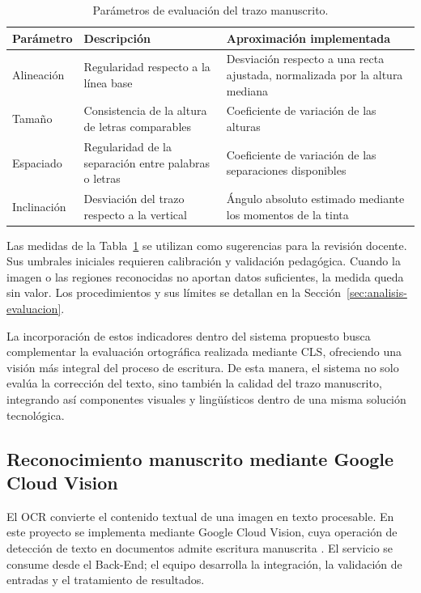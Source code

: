 \begin{table}[H]
\centering
\caption{Parámetros de evaluación del trazo manuscrito.}
\label{tab:parametros_evaluacion}
\renewcommand{\arraystretch}{1.5} %
\begin{tabular}{|>{\centering\arraybackslash}m{3cm}|>{\centering\arraybackslash}m{5.5cm}|>{\centering\arraybackslash}m{6cm}|}
\hline
\textbf{Parámetro} & \textbf{Descripción} & \textbf{Aproximación implementada} \\ \hline
Alineación & Regularidad respecto a la línea base & Desviación respecto a una recta ajustada, normalizada por la altura mediana \\ \hline
Tamaño & Consistencia de la altura de letras comparables & Coeficiente de variación de las alturas \\ \hline
Espaciado & Regularidad de la separación entre palabras o letras & Coeficiente de variación de las separaciones disponibles \\ \hline
Inclinación & Desviación del trazo respecto a la vertical & Ángulo absoluto estimado mediante los momentos de la tinta \\ \hline
\end{tabular}
\end{table}

Las medidas de la Tabla~\ref{tab:parametros_evaluacion} se utilizan como sugerencias para la revisión docente. Sus umbrales iniciales requieren calibración y validación pedagógica. Cuando la imagen o las regiones reconocidas no aportan datos suficientes, la medida queda sin valor. Los procedimientos y sus límites se detallan en la Sección~\ref{sec:analisis-evaluacion}.

La incorporación de estos indicadores dentro del sistema propuesto busca complementar la evaluación ortográfica realizada mediante CLS, ofreciendo una visión más integral del proceso de escritura. De esta manera, el sistema no solo evalúa la corrección del texto, sino también la calidad del trazo manuscrito, integrando así componentes visuales y lingüísticos dentro de una misma solución tecnológica.


\subsection{Reconocimiento manuscrito mediante Google Cloud Vision}
El OCR convierte el contenido textual de una imagen en texto procesable. En este proyecto se implementa mediante Google Cloud Vision, cuya operación de detección de texto en documentos admite escritura manuscrita \cite{googlevisionHandwriting}. El servicio se consume desde el Back-End; el equipo desarrolla la integración, la validación de entradas y el tratamiento de resultados.

